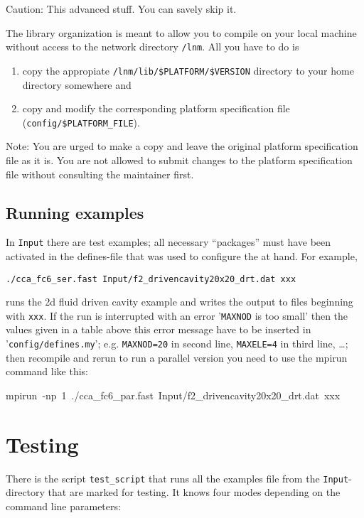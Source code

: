 Caution: This advanced stuff. You can savely skip it.

The \ccarat{} library organization is meant to allow you to compile
\ccarat{} on your local machine without access to the network directory
\texttt{/lnm}. All you have to do is

\begin{enumerate}
\item copy the appropiate \texttt{/lnm/lib/\$PLATFORM/\$VERSION} directory
to your home directory somewhere and
\item copy and modify the corresponding platform specification file (\texttt{config/\$PLATFORM\_FILE}).
\end{enumerate}
Note: You are urged to make a copy and leave the original platform
specification file as it is. You are not allowed to submit changes
to the platform specification file without consulting the \ccarat{}
maintainer first.


\subsection{Running examples}\label{beginner:sec:running-examples}

In \texttt{Input} there are test examples; all necessary ``packages''
must have been activated in the defines-file that was used to configure
the \ccarat{} at hand. For example,

\texttt{./cca\_fc6\_ser.fast Input/f2\_drivencavity20x20\_drt.dat xxx }

runs the 2d fluid driven cavity example and writes the output to files
beginning with \texttt{xxx}. If the run is interrupted with an error
'\texttt{MAXNOD} is too small' then the values given in a table above
this error message have to be inserted in '\texttt{config/defines.my}';
e.g. \texttt{MAXNOD=20} in second line, \texttt{MAXELE=4} in third
line, \ldots; then recompile and rerun to run a parallel version you
need to use the mpirun command like this:

\begin{lyxcode}
mpirun~-np~1~./cca\_fc6\_par.fast~Input/f2\_drivencavity20x20\_drt.dat~xxx
\end{lyxcode}

\section{Testing}

There is the script \texttt{test\_script} that runs all the examples
file from the \texttt{Input}-directory that are marked for testing.
It knows four modes depending on the command line parameters:

